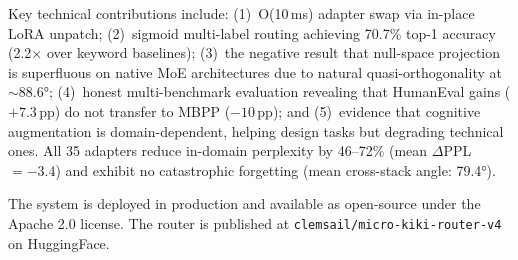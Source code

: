 \documentclass[11pt,a4paper]{article}
\begin{document}
Key technical contributions include: (1)~O(10\,ms) adapter swap via in-place LoRA unpatch; (2)~sigmoid multi-label routing achieving 70.7\% top-1 accuracy (2.2$\times$ over keyword baselines); (3)~the negative result that null-space projection is superfluous on native MoE architectures due to natural quasi-orthogonality at ${\sim}88.6$°; (4)~honest multi-benchmark evaluation revealing that HumanEval gains ($+7.3$\,pp) do not transfer to MBPP ($-10$\,pp); and (5)~evidence that cognitive augmentation is domain-dependent, helping design tasks but degrading technical ones. All 35 adapters reduce in-domain perplexity by 46--72\% (mean $\Delta$PPL~$= -3.4$) and exhibit no catastrophic forgetting (mean cross-stack angle: 79.4°).

The system is deployed in production and available as open-source under the Apache 2.0 license. The router is published at \texttt{clemsail/micro-kiki-router-v4} on HuggingFace.


\end{document}
